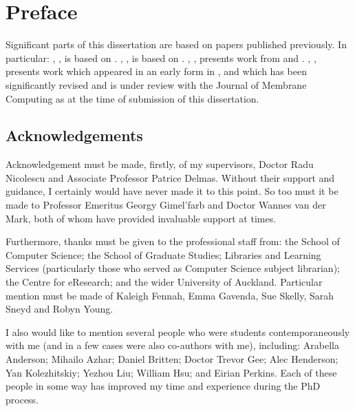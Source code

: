 \chapter*{Preface}

Significant parts of this dissertation are based on papers published previously.  In particular: , , is based on \cite{Cooper2019}.  , , is based on \cite{Cooper2019a}.  , , presents work from \cite{Cooper2018} and \cite{Cooper2021}.  , , presents work which appeared in an early form in \cite{Cooper2020}, and which has been significantly revised and is under review with the Journal of Membrane Computing as at the time of submission of this dissertation.

\section*{Acknowledgements}

Acknowledgement must be made, firstly, of my supervisors, Doctor Radu Nicolescu and Associate Professor Patrice Delmas.  Without their support and guidance, I certainly would have never made it to this point.  So too must it be made to Professor Emeritus Georgy Gimel'farb and Doctor Wannes van der Mark, both of whom have provided invaluable support at times.%

Furthermore, thanks must be given to the professional staff from: the School of Computer Science; the School of Graduate Studies; Libraries and Learning Services (particularly those who served as Computer Science subject librarian); the Centre for eResearch; and the wider University of Auckland.  Particular mention must be made of Kaleigh Fennah, Emma Gavenda, Sue Skelly, Sarah Sneyd and Robyn Young.

I also would like to mention several people who were students contemporaneously with me (and in a few cases were also co-authors with me), including: Arabella Anderson; Mihailo Azhar; Daniel Britten; Doctor Trevor Gee; Alec Henderson; Yan Kolezhitskiy; Yezhou Liu; William Hsu; and Eirian Perkins.  Each of these people in some way has improved my time and experience during the PhD process.


